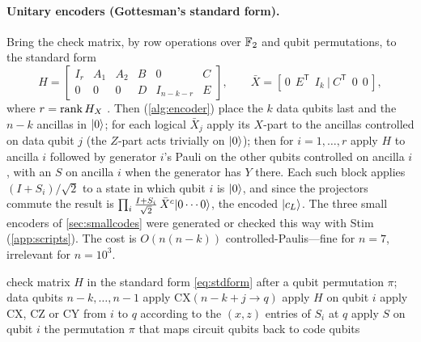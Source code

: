 \paragraph{Unitary encoders (Gottesman's standard form).} Bring the check matrix, by row operations over $\mathbb{F}_2$ and qubit permutations, to the standard form
\begin{equation}\label{eq:stdform}
H=\left[\begin{array}{ccc|ccc} I_r & A_1 & A_2 & B & 0 & C\\ 0&0&0& D & I_{n-k-r} & E\end{array}\right],\qquad
\bar X=\left[\,0\ \ E^{\mathsf T}\ \ I_k\ \big|\ C^{\mathsf T}\ \ 0\ \ 0\,\right],
\end{equation}
where $r=\operatorname{rank} H_X$ \cite{gottesman97}. Then (\cref{alg:encoder}) place the $k$ data qubits last and the $n-k$ ancillas in $\lvert 0 \rangle$; for each logical $\bar X_j$ apply its $X$-part to the ancillas controlled on data qubit $j$ (the $Z$-part acts trivially on $\lvert 0 \rangle$); then for $i=1,\dots,r$ apply $H$ to ancilla $i$ followed by generator $i$'s Pauli on the other qubits controlled on ancilla $i$, with an $S$ on ancilla $i$ when the generator has $Y$ there. Each such block applies $(I+S_i)/\sqrt2$ to a state in which qubit $i$ is $\lvert 0 \rangle$, and since the projectors commute the result is $\prod_i\frac{I+S_i}{\sqrt2}\,\bar X^{c}\lvert 0\cdots0 \rangle$, the encoded $\lvert c_L \rangle$. The three small encoders of \cref{sec:smallcodes} were generated or checked this way with Stim (\cref{app:scripts}). The cost is $O(n(n-k))$ controlled-Paulis---fine for $n=7$, irrelevant for $n=10^3$.

\begin{algorithm}[H]
\caption{Standard-form encoder for an $\bits{n}{k}{d}$ stabiliser code (verified in )}\label{alg:encoder}
\begin{algorithmic}[1]
\Require check matrix $H$ in the standard form \eqref{eq:stdform} after a qubit permutation $\pi$; data qubits $n-k,\dots,n-1$
   apply $\mathrm{CX}(n-k+j\to q)$ \EndFor
\EndFor
{}
  \State apply $H$ on qubit $i$
   apply $\mathrm{CX}$, $\mathrm{CZ}$ or $\mathrm{CY}$ from $i$ to $q$ according to the $(x,z)$ entries of $S_i$ at $q$ \EndFor
   apply $S$ on qubit $i$ \EndIf
\EndFor
\State \Return the permutation $\pi$ that maps circuit qubits back to code qubits
\end{algorithmic}
\end{algorithm}

